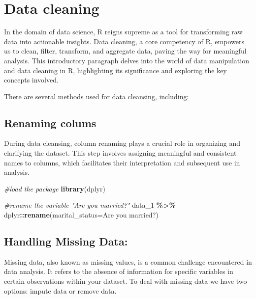 \documentclass[
]{book}
\newenvironment{Shaded}{\begin{snugshade}}{\end{snugshade}}
\newcommand{\AttributeTok}[1]{\textcolor[rgb]{0.13,0.29,0.53}{#1}}
\newcommand{\CommentTok}[1]{\textcolor[rgb]{0.56,0.35,0.01}{\textit{#1}}}
\newcommand{\FunctionTok}[1]{\textcolor[rgb]{0.13,0.29,0.53}{\textbf{#1}}}
\newcommand{\NormalTok}[1]{#1}
\newcommand{\SpecialCharTok}[1]{\textcolor[rgb]{0.81,0.36,0.00}{\textbf{#1}}}
\newcommand{\StringTok}[1]{\textcolor[rgb]{0.31,0.60,0.02}{#1}}
\begin{document}
\hypertarget{data-cleaning}{%
\chapter{Data cleaning}\label{data-cleaning}}

In the domain of data science, R reigns supreme as a tool for transforming raw data into actionable insights.
Data cleaning, a core competency of R, empowers us to clean, filter, transform, and aggregate data, paving the way for meaningful analysis. This introductory paragraph delves into the world of data manipulation and data cleaning in R, highlighting its significance and exploring the key concepts involved.

There are several methods used for data cleansing, including:

\hypertarget{renaming-colums}{%
\section{Renaming colums}\label{renaming-colums}}

During data cleansing, column renaming plays a crucial role in organizing and clarifying the dataset. This step involves assigning meaningful and consistent names to columns, which facilitates their interpretation and subsequent use in analysis.

\begin{Shaded}
\begin{Highlighting}[]
\CommentTok{\#load the package}
\FunctionTok{library}\NormalTok{(dplyr)}

\CommentTok{\#rename the variable "Are you married?"}
\NormalTok{data\_1 }\SpecialCharTok{\%\textgreater{}\%}
\NormalTok{  dplyr}\SpecialCharTok{::}\FunctionTok{rename}\NormalTok{(}\AttributeTok{marital\_status=}\StringTok{\textasciigrave{}}\AttributeTok{Are you married?}\StringTok{\textasciigrave{}}\NormalTok{)}
\end{Highlighting}
\end{Shaded}

\hypertarget{handling-missing-data}{%
\section{Handling Missing Data:}\label{handling-missing-data}}

Missing data, also known as missing values, is a common challenge encountered in data analysis. It refers to the absence of information for specific variables in certain observations within your dataset. To deal with missing data we have two options: impute data or remove data.
\end{document}
